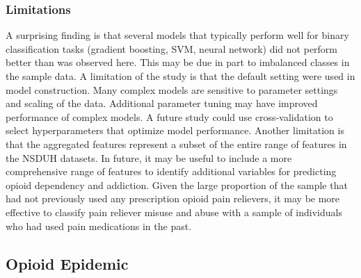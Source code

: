 \documentclass[sigconf]{acmart}
\begin{document}

\subsubsection{Limitations}

A surprising finding is that several models that typically perform well for 
binary classification tasks (gradient boosting, SVM, neural network) did not 
perform better than was observed here. This may be due in part to imbalanced 
classes in the sample data. A limitation of the study is that the default 
setting were used in model construction. Many complex models are sensitive 
to parameter settings and scaling of the data. Additional parameter tuning 
may have improved performance of complex models. A future study could use 
cross-validation to select hyperparameters that optimize model performance.
Another limitation is that the aggregated features represent a subset
of the entire range of features in the NSDUH datasets. In future, it may
be useful to include a more comprehensive range of features to identify 
additional variables for predicting opioid dependency and addiction. 
Given the large proportion of the sample that had not previously used any
prescription opioid pain relievers, it may be more effective to classify 
pain reliever misuse and abuse with a sample of individuals who had used 
pain medications in the past.


\subsection{Opioid Epidemic}
\end{document}
